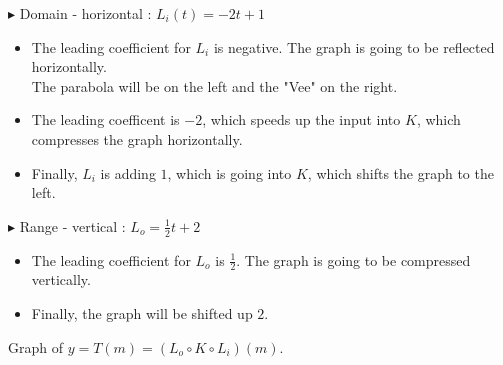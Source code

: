 \documentclass{ximera}
\begin{document}
$\blacktriangleright$ Domain - horizontal : $L_i(t) = -2t + 1$


\begin{itemize}
\item The leading coefficient for $L_i$ is negative.  The graph is going to be reflected horizontally. \\
The parabola will be on the left and the "Vee" on the right.
\item The leading coefficent is $-2$, which speeds up the input into $K$, which compresses the graph horizontally.
\item Finally, $L_i$ is adding $1$, which is going into $K$, which shifts the graph to the left.

\end{itemize}





$\blacktriangleright$ Range - vertical : $L_o = \frac{1}{2}t + 2$


\begin{itemize}
\item The leading coefficient for $L_o$ is $\frac{1}{2}$.  The graph is going to be compressed vertically. \\
\item Finally, the graph will be shifted up $2$.

\end{itemize}


Graph of $ y = T(m) = (L_o \circ K \circ L_i)(m)$.
\end{document}
